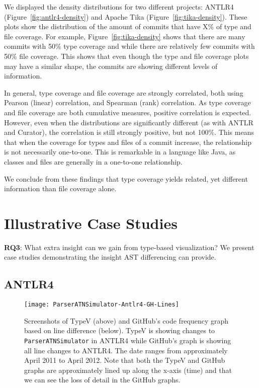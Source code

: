 We displayed the density distributions for two different projects: ANTLR4 (Figure~\ref{fig:antlr4-density}) and Apache Tika (Figure~\ref{fig:tika-density}). These plots show the distribution of the amount of commits that have X\% of type and file coverage. For example, Figure~\ref{fig:tika-density} shows that there are many commits with 50\% type coverage and while there are relatively few commits with 50\% file coverage. This shows that even though the type and file coverage plots may have a similar shape, the commits are showing different levels of information. 

In general, type coverage and file coverage are strongly correlated, both using Pearson (linear) correlation, and Spearman (rank) correlation. As type coverage and file coverage are both cumulative measures, positive correlation is expected. However, even when the distributions are significantly different (as with ANTLR and Curator), the correlation is still strongly positive, but not 100\%. This means that when the coverage for types and files of a commit increase, the relationship is not necessarily one-to-one. This is remarkable in a language like Java, as classes and files are generally in a one-to-one relationship.

We conclude from these findings that type coverage yields related, yet different information than file coverage alone.

\section{Illustrative Case Studies}
\label{sec:cases}

\textbf{RQ3}: What extra insight can we gain from type-based visualization? We present case studies demonstrating the insight AST differencing can provide.

\subsection{ANTLR4}\label{sec:antlr4}

\begin{figure}[!ht]
\centering
\texttt{[image: ParserATNSimulator-Antlr4-GH-Lines]}
\caption{Screenshots of TypeV (above) and GitHub's code frequency graph based on line difference (below). TypeV is showing changes to \texttt{ParserATNSimulator} in ANTLR4 while GitHub's graph is showing all line changes to ANTLR4. The date ranges from approximately April 2011 to April 2012. Note that both the TypeV and GitHub graphs are approximately lined up along the x-axis (time) and that we can see the loss of detail in the GitHub graphs.}
\label{fig:parser}
\end{figure}


